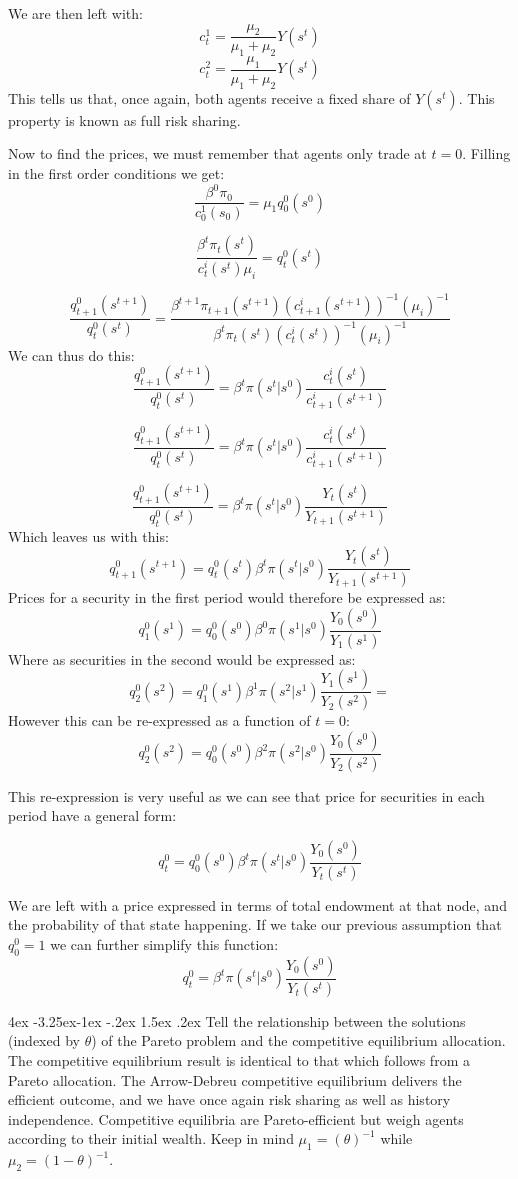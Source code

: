 \documentclass[10pt]{article}
\makeatletter
\newcommand{\bb}{\bigbreak\noindent}
\renewcommand\subsection{\leftskip 4ex\@startsection{subsection}{2}{\z@}%
	{-3.25ex\@plus -1ex \@minus -.2ex}%
	{1.5ex \@plus .2ex}%
	{\normalfont\large\bfseries}}
\makeatother
\begin{document}
\begin{spacing}{1.5}
We are then left with:
\[ c^1_t = \frac{\mu_2}{\mu_1 + \mu_2}Y(s^t)\]
\[ c^2_t = \frac{\mu_1}{\mu_1 + \mu_2}Y(s^t)\]
\bb
This tells us that, once again, both agents receive a fixed share of $Y(s^t)$.  This property is known as full risk sharing.

\bb
Now to find the prices, we must remember that agents only trade at $t=0$.   Filling in the first order conditions we get:
\[ \dfrac{\beta^0 \pi_0}{c^1_0(s_0)} = \mu_1 q^0_0(s^0) \]

\[ \frac{\beta^t \pi_t(s^t)}{c^i_t(s^t)\mu_i} =  q^0_t(s^t) \]

\[ \dfrac{q^0_{t+1}(s^{t+1})}{q^0_{t}(s^t)} = 
			\frac
			{\beta^{t+1} \pi_{t+1}(s^{t+1}) (c^i_{t+1}(s^{t+1}))^{-1} (\mu_i)^{-1}}
			{\beta^{t} \pi_{t}(s^{t}) (c^i_{t}(s^{t}))^{-1} (\mu_i)^{-1}}
\]
We can thus do this:
\[ \dfrac{q^0_{t+1}(s^{t+1})}{q^0_{t}(s^t)} = 
\beta^t\pi(s^t  | s^0) \frac
{c^i_{t}(s^{t})}
{c^i_{t+1}(s^{t+1})}
\]

\[ \dfrac{q^0_{t+1}(s^{t+1})}{q^0_{t}(s^t)} = 
\beta^t\pi(s^t  | s^0) \frac
{c^i_{t}(s^{t})}
{c^i_{t+1}(s^{t+1})}
\]

\[ \dfrac{q^0_{t+1}(s^{t+1})}{q^0_{t}(s^t)} = 
\beta^t\pi(s^t  | s^0) \frac
{Y_{t}(s^{t})}
{Y_{t+1}(s^{t+1})}
\]
Which leaves us with this:
\[ q^0_{t+1}(s^{t+1}) = 
{q^0_{t}(s^t)\beta^t\pi(s^t  | s^0) 
\frac{Y_{t}(s^{t})}
{Y_{t+1}(s^{t+1})}} \]
\bb
Prices for a security in the first period would therefore be expressed as: 
\[ q^0_{1}(s^{1}) = 
{q^0_{0}(s^0)\beta^0\pi(s^1  | s^0) 
\frac{Y_{0}(s^{0})}
{Y_{1}(s^{1})}} \]
Where as securities in the second would be expressed as: 
\[ q^0_{2}(s^{2}) = 
{q^0_{1}(s^1)\beta^1\pi(s^2  | s^1) 
\frac{Y_{1}(s^{1})}
{Y_{2}(s^{2})}} = \]
\bb
However this can be re-expressed as a function of $t=0$:  
\[ q^0_{2}(s^{2}) = 
{q^0_{0}(s^0)\beta^2\pi(s^2  | s^0) 
	\frac{Y_{0}(s^{0})}
	{Y_{2}(s^{2})}} \]

\bb
This re-expression is very useful as we can see that price for securities in each period have a general form:
\begin{framed}
	\[ q^0_t = q^0_{0}(s^0)\beta^t\pi(s^t | s^0) \dfrac{Y_0(s^0)}{Y_t(s^t)}\]
\end{framed}


\bb
We are left with a price expressed in terms of total endowment at that node, and the probability of that state happening.  If we take our previous assumption that $q^0_{0} = 1$ we can further simplify this function:  
\[ q^0_t = \beta^t\pi(s^t | s^0) \dfrac{Y_0(s^0)}{Y_t(s^t)}\]

\subsection{Tell the relationship between the solutions (indexed by $\theta$) of the Pareto problem and the competitive equilibrium allocation.}
The competitive equilibrium result is identical to that which follows from a Pareto allocation. 
The Arrow-Debreu competitive equilibrium delivers the efficient outcome, and we have once again risk sharing as well as history independence. Competitive equilibria are Pareto-efficient but weigh agents according to their initial wealth. Keep in mind $\mu_1 = (\theta)^{-1}$ while
$\mu_2 = (1-\theta)^{-1}$. 


	\end{spacing}
\end{document}
